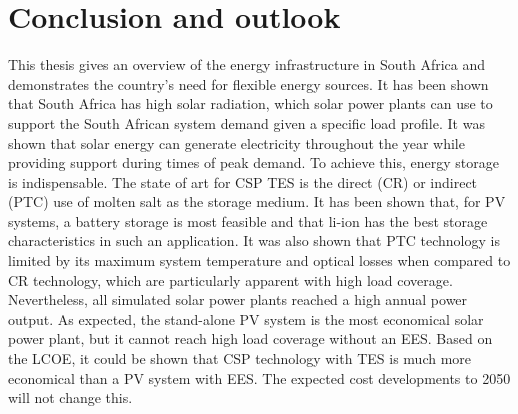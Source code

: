 \chapter{Conclusion and outlook}

This thesis gives an overview of the energy infrastructure in South Africa and demonstrates the country's need for flexible energy sources. It has been shown that South Africa has high solar radiation, which solar power plants can use to support the South African system demand given a specific load profile. It was shown that solar energy can generate electricity throughout the year while providing support during times of peak demand. To achieve this, energy storage is indispensable. The state of art for \ac{CSP} \ac{TES} is the direct (\ac{CR}) or indirect (\ac{PTC}) use of molten salt as the storage medium. It has been shown that, for \ac{PV} systems, a battery storage is most feasible and that \ac{li-ion} has the best storage characteristics in such an application. It was also shown that \ac{PTC} technology is limited by its maximum system temperature and optical losses when compared to \ac{CR} technology, which are particularly apparent with high load coverage. Nevertheless, all simulated solar power plants reached a high annual power output. As expected, the stand-alone \ac{PV} system is the most economical solar power plant, but it cannot reach high load coverage without an \ac{EES}. Based on the \ac{LCOE}, it could be shown that \ac{CSP} technology with \ac{TES} is much more economical than a \ac{PV} system with \ac{EES}. The expected cost developments to 2050 will not change this.

